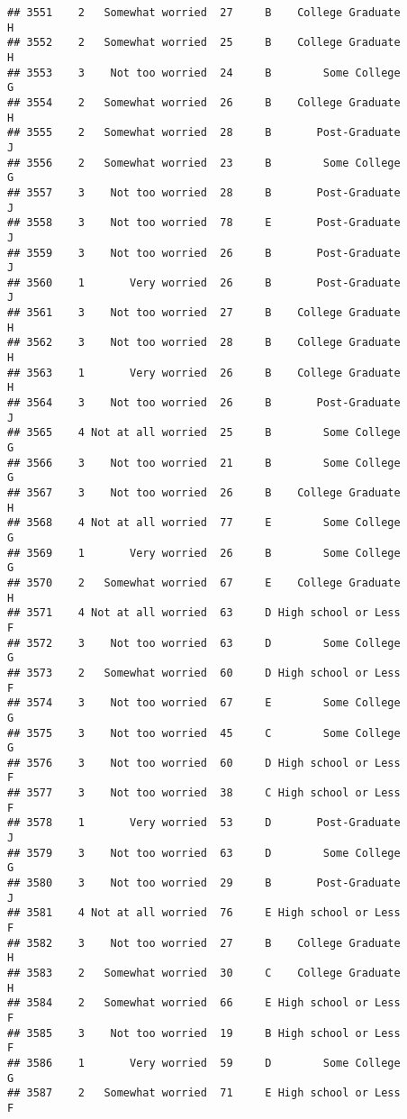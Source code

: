 \documentclass[
]{article}
\begin{document}
\begin{verbatim}
## 3551    2   Somewhat worried  27     B    College Graduate         H
## 3552    2   Somewhat worried  25     B    College Graduate         H
## 3553    3    Not too worried  24     B        Some College         G
## 3554    2   Somewhat worried  26     B    College Graduate         H
## 3555    2   Somewhat worried  28     B       Post-Graduate         J
## 3556    2   Somewhat worried  23     B        Some College         G
## 3557    3    Not too worried  28     B       Post-Graduate         J
## 3558    3    Not too worried  78     E       Post-Graduate         J
## 3559    3    Not too worried  26     B       Post-Graduate         J
## 3560    1       Very worried  26     B       Post-Graduate         J
## 3561    3    Not too worried  27     B    College Graduate         H
## 3562    3    Not too worried  28     B    College Graduate         H
## 3563    1       Very worried  26     B    College Graduate         H
## 3564    3    Not too worried  26     B       Post-Graduate         J
## 3565    4 Not at all worried  25     B        Some College         G
## 3566    3    Not too worried  21     B        Some College         G
## 3567    3    Not too worried  26     B    College Graduate         H
## 3568    4 Not at all worried  77     E        Some College         G
## 3569    1       Very worried  26     B        Some College         G
## 3570    2   Somewhat worried  67     E    College Graduate         H
## 3571    4 Not at all worried  63     D High school or Less         F
## 3572    3    Not too worried  63     D        Some College         G
## 3573    2   Somewhat worried  60     D High school or Less         F
## 3574    3    Not too worried  67     E        Some College         G
## 3575    3    Not too worried  45     C        Some College         G
## 3576    3    Not too worried  60     D High school or Less         F
## 3577    3    Not too worried  38     C High school or Less         F
## 3578    1       Very worried  53     D       Post-Graduate         J
## 3579    3    Not too worried  63     D        Some College         G
## 3580    3    Not too worried  29     B       Post-Graduate         J
## 3581    4 Not at all worried  76     E High school or Less         F
## 3582    3    Not too worried  27     B    College Graduate         H
## 3583    2   Somewhat worried  30     C    College Graduate         H
## 3584    2   Somewhat worried  66     E High school or Less         F
## 3585    3    Not too worried  19     B High school or Less         F
## 3586    1       Very worried  59     D        Some College         G
## 3587    2   Somewhat worried  71     E High school or Less         F

\end{verbatim}
\end{document}
